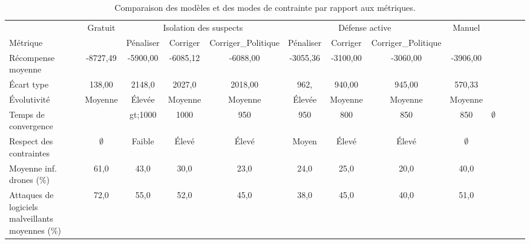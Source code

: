 \begin{table}[t]
  \centering
  \setlength{\tabcolsep}{4.5pt}
  \caption{Comparaison des modèles et des modes de contrainte par rapport aux métriques.}
  \label{tab:metrics_comparison}
  \begin{tabular}{lcccccccccccc}
                                                     & {Gratuit}   & \multicolumn{3}{c}{Isolation des suspects} & \multicolumn{3}{c}{Défense active} & {Manuel}                                                                                     \\
    Métrique                                         &             & Pénaliser                                  & Corriger                           & Corriger\_Politique & Pénaliser & Corriger & Corriger\_Politique &                           \\
    \midrule
    Récompense moyenne                               & -8727,49    & -5900,00                                   & -6085,12                           & -6088,00            & -3055,36  & -3100,00 & -3060,00            & -3906,00                  \\
    Écart type                                       & 138,00      & 2148,0                                     & 2027,0                             & 2018,00             & 962,      & 940,00   & 945,00              & 570,33                    \\
    Évolutivité                                      & Moyenne     & Élevée                                     & Moyenne                            & Moyenne             & Élevée    & Moyenne  & Moyenne             & Moyenne                   \\
    Temps de convergence                             &             & gt;1000                                    & 1000                               & 950                 & 950       & 800      & 850                 & 850         & $\emptyset$ \\
    Respect des contraintes                          & $\emptyset$ & Faible                                     & Élevé                              & Élevé               & Moyen     & Élevé    & Élevé               & $\emptyset$               \\
    Moyenne inf. drones (\%)                         & 61,0        & 43,0                                       & 30,0                               & 23,0                & 24,0      & 25,0     & 20,0                & 40,0                      \\
    Attaques de logiciels malveillants moyennes (\%) & 72,0        & 55,0                                       & 52,0                               & 45,0                & 38,0      & 45,0     & 40,0                & 51,0                      \\
  \end{tabular}
\end{table}

